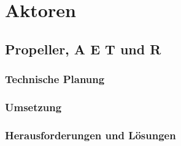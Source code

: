 \chapter{Aktoren}
\renewcommand{\kapitelautor}{Autor: Lucas Ullrich}

\section{Propeller, A E T und R}

  \subsection{Technische Planung}

  \subsection{Umsetzung}

  \subsection{Herausforderungen und Lösungen}
